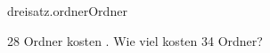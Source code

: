 \begin{exercise}{dreisatz.ordner}{Ordner}
  \ifproblem\problem\par
    28 Ordner kosten . Wie viel kosten 34 Ordner?
  \fi
\end{exercise}
